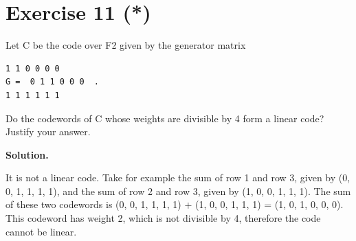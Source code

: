 \documentclass[11pt]{article}
\begin{document}
\section*{Exercise 11 (*)}
\begin{exercisebox}
Let C be the code over F2 given by the generator matrix

\begin{Verbatim}[fontsize=\small]
1 1 0 0 0 0
G =  0 1 1 0 0 0  .
1 1 1 1 1 1
\end{Verbatim}
Do the codewords of C whose weights are divisible by 4 form a linear code? Justify your answer.

\end{exercisebox}
\begin{solutionbox}
\textbf{Solution.}

It is not a linear code. Take for example the sum of row 1 and row 3, given by (0, 0, 1, 1, 1, 1), and the sum of row 2 and row 3, given by (1, 0, 0, 1, 1, 1). The sum of these two codewords is (0, 0, 1, 1, 1, 1) + (1, 0, 0, 1, 1, 1) = (1, 0, 1, 0, 0, 0). This codeword has weight 2, which is not divisible by 4, therefore the code cannot be linear.

\end{solutionbox}
\end{document}
